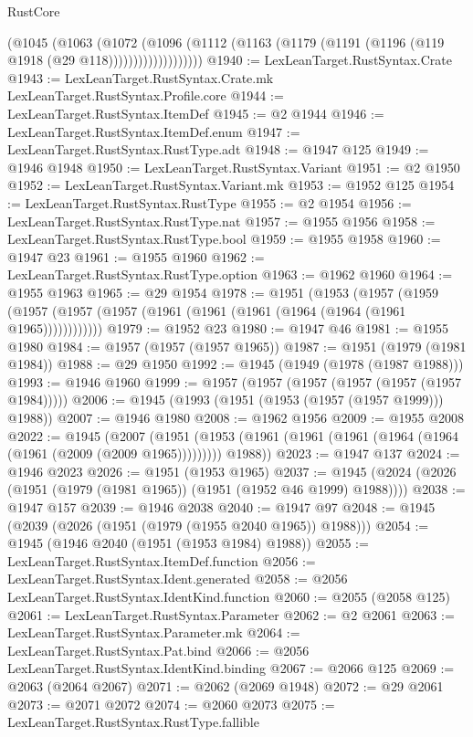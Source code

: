 \begin{lexlean}{RustCore}
\begin{coremodule}
                    (@1045
                      (@1063
                        (@1072
                          (@1096
                            (@1112
                              (@1163 (@1179 (@1191 (@1196 (@119 @1918 (@29 @118)))))))))))))))))))
@1940 := LexLeanTarget.RustSyntax.Crate
@1943 := LexLeanTarget.RustSyntax.Crate.mk LexLeanTarget.RustSyntax.Profile.core
@1944 := LexLeanTarget.RustSyntax.ItemDef
@1945 := @2 @1944
@1946 := LexLeanTarget.RustSyntax.ItemDef.enum
@1947 := LexLeanTarget.RustSyntax.RustType.adt
@1948 := @1947 @125
@1949 := @1946 @1948
@1950 := LexLeanTarget.RustSyntax.Variant
@1951 := @2 @1950
@1952 := LexLeanTarget.RustSyntax.Variant.mk
@1953 := @1952 @125
@1954 := LexLeanTarget.RustSyntax.RustType
@1955 := @2 @1954
@1956 := LexLeanTarget.RustSyntax.RustType.nat
@1957 := @1955 @1956
@1958 := LexLeanTarget.RustSyntax.RustType.bool
@1959 := @1955 @1958
@1960 := @1947 @23
@1961 := @1955 @1960
@1962 := LexLeanTarget.RustSyntax.RustType.option
@1963 := @1962 @1960
@1964 := @1955 @1963
@1965 := @29 @1954
@1978 := @1951
    (@1953
      (@1957 (@1959 (@1957 (@1957 (@1957 (@1961 (@1961 (@1961 (@1964 (@1964 (@1961 @1965))))))))))))
@1979 := @1952 @23
@1980 := @1947 @46
@1981 := @1955 @1980
@1984 := @1957 (@1957 (@1957 @1965))
@1987 := @1951 (@1979 (@1981 @1984))
@1988 := @29 @1950
@1992 := @1945 (@1949 (@1978 (@1987 @1988)))
@1993 := @1946 @1960
@1999 := @1957 (@1957 (@1957 (@1957 (@1957 (@1957 @1984)))))
@2006 := @1945 (@1993 (@1951 (@1953 (@1957 (@1957 @1999))) @1988))
@2007 := @1946 @1980
@2008 := @1962 @1956
@2009 := @1955 @2008
@2022 := @1945
    (@2007
      (@1951 (@1953 (@1961 (@1961 (@1961 (@1964 (@1964 (@1961 (@2009 (@2009 @1965))))))))) @1988))
@2023 := @1947 @137
@2024 := @1946 @2023
@2026 := @1951 (@1953 @1965)
@2037 := @1945 (@2024 (@2026 (@1951 (@1979 (@1981 @1965)) (@1951 (@1952 @46 @1999) @1988))))
@2038 := @1947 @157
@2039 := @1946 @2038
@2040 := @1947 @97
@2048 := @1945 (@2039 (@2026 (@1951 (@1979 (@1955 @2040 @1965)) @1988)))
@2054 := @1945 (@1946 @2040 (@1951 (@1953 @1984) @1988))
@2055 := LexLeanTarget.RustSyntax.ItemDef.function
@2056 := LexLeanTarget.RustSyntax.Ident.generated
@2058 := @2056 LexLeanTarget.RustSyntax.IdentKind.function
@2060 := @2055 (@2058 @125)
@2061 := LexLeanTarget.RustSyntax.Parameter
@2062 := @2 @2061
@2063 := LexLeanTarget.RustSyntax.Parameter.mk
@2064 := LexLeanTarget.RustSyntax.Pat.bind
@2066 := @2056 LexLeanTarget.RustSyntax.IdentKind.binding
@2067 := @2066 @125
@2069 := @2063 (@2064 @2067)
@2071 := @2062 (@2069 @1948)
@2072 := @29 @2061
@2073 := @2071 @2072
@2074 := @2060 @2073
@2075 := LexLeanTarget.RustSyntax.RustType.fallible

\end{coremodule}
\end{lexlean}
